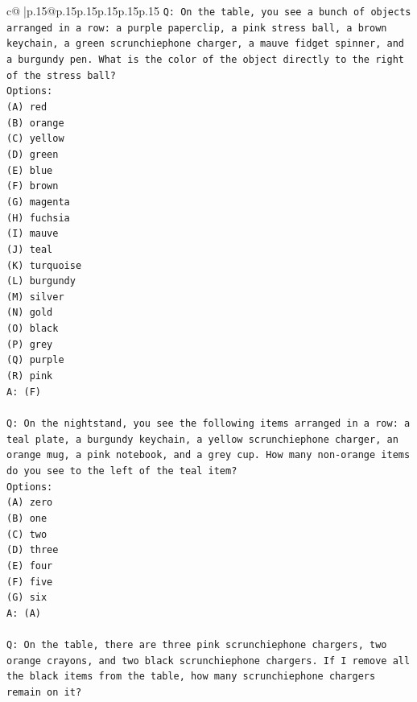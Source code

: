 \documentclass{article}
\begin{document}
{\begin{supertabular}{c@{$\;$}|p{.15\linewidth}@{}p{.15\linewidth}p{.15\linewidth}p{.15\linewidth}p{.15\linewidth}p{.15\linewidth}}
{{{\texttt{Q: On the table, you see a bunch of objects arranged in a row: a purple paperclip, a pink stress ball, a brown keychain, a green scrunchiephone charger, a mauve fidget spinner, and a burgundy pen. What is the color of the object directly to the right of the stress ball?} \\
\texttt{Options:} \\
\texttt{(A) red} \\
\texttt{(B) orange} \\
\texttt{(C) yellow} \\
\texttt{(D) green} \\
\texttt{(E) blue} \\
\texttt{(F) brown} \\
\texttt{(G) magenta} \\
\texttt{(H) fuchsia} \\
\texttt{(I) mauve} \\
\texttt{(J) teal} \\
\texttt{(K) turquoise} \\
\texttt{(L) burgundy} \\
\texttt{(M) silver} \\
\texttt{(N) gold} \\
\texttt{(O) black} \\
\texttt{(P) grey} \\
\texttt{(Q) purple} \\
\texttt{(R) pink} \\
\texttt{A: (F)} \\
\\ 
\texttt{Q: On the nightstand, you see the following items arranged in a row: a teal plate, a burgundy keychain, a yellow scrunchiephone charger, an orange mug, a pink notebook, and a grey cup. How many non{-}orange items do you see to the left of the teal item?} \\
\texttt{Options:} \\
\texttt{(A) zero} \\
\texttt{(B) one} \\
\texttt{(C) two} \\
\texttt{(D) three} \\
\texttt{(E) four} \\
\texttt{(F) five} \\
\texttt{(G) six} \\
\texttt{A: (A)} \\
\\ 
\texttt{Q: On the table, there are three pink scrunchiephone chargers, two orange crayons, and two black scrunchiephone chargers. If I remove all the black items from the table, how many scrunchiephone chargers remain on it?} \\
}}}
\end{supertabular}}
\end{document}
